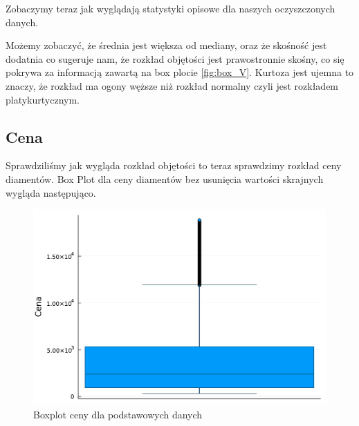 \documentclass[12pt]{article}
\theoremstyle{exer}
\begin{document}
	Zobaczymy teraz jak wyglądają statystyki opisowe dla naszych oczyszczonych danych.
	
	\begin{table}[H]
		\caption{Podstawowe statystyki opisowe dla objętości}
		\label{tab:statystyki_V}
	\end{table}
	Możemy zobaczyć, że średnia jest większa  od mediany, oraz że skośność jest dodatnia co sugeruje nam, że rozkład objętości jest prawostronnie skośny, co się pokrywa za informacją zawartą na box plocie \ref{fig:box_V}. Kurtoza jest ujemna to znaczy, że rozkład ma ogony węższe niż rozkład normalny czyli jest rozkładem platykurtycznym. 
	
	\subsection{Cena}
	Sprawdziliśmy jak wygląda rozkład objętości to teraz sprawdzimy rozkład ceny diamentów.
	Box Plot dla ceny diamentów bez usunięcia wartości skrajnych wygląda następująco.
	\begin{figure}[H]
		\centering
		\includegraphics[width=4\columnwidth/5]{images/boxplot_price_danych.pdf}
		\caption{Boxplot ceny dla podstawowych danych}
		\label{fig:box_price_orginal}
	\end{figure}
	
\end{document}

